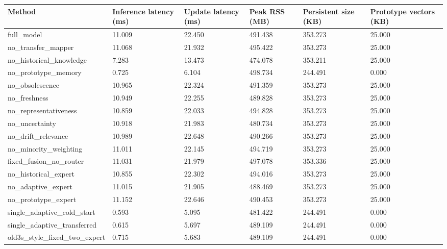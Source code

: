 \begin{tabular}{llllll}
\toprule
Method & Inference latency (ms) & Update latency (ms) & Peak RSS (MB) & Persistent size (KB) & Prototype vectors (KB) \\
\midrule
full\_model & 11.009 & 22.450 & 491.438 & 353.273 & 25.000 \\
no\_transfer\_mapper & 11.068 & 21.932 & 495.422 & 353.273 & 25.000 \\
no\_historical\_knowledge & 7.283 & 13.473 & 474.078 & 353.211 & 25.000 \\
no\_prototype\_memory & 0.725 & 6.104 & 498.734 & 244.491 & 0.000 \\
no\_obsolescence & 10.965 & 22.324 & 491.359 & 353.273 & 25.000 \\
no\_freshness & 10.949 & 22.255 & 489.828 & 353.273 & 25.000 \\
no\_representativeness & 10.859 & 22.033 & 494.828 & 353.273 & 25.000 \\
no\_uncertainty & 10.918 & 21.983 & 480.734 & 353.273 & 25.000 \\
no\_drift\_relevance & 10.989 & 22.648 & 490.266 & 353.273 & 25.000 \\
no\_minority\_weighting & 11.011 & 22.145 & 494.719 & 353.273 & 25.000 \\
fixed\_fusion\_no\_router & 11.031 & 21.979 & 497.078 & 353.336 & 25.000 \\
no\_historical\_expert & 10.855 & 22.302 & 494.016 & 353.273 & 25.000 \\
no\_adaptive\_expert & 11.015 & 21.905 & 488.469 & 353.273 & 25.000 \\
no\_prototype\_expert & 11.152 & 22.646 & 490.453 & 353.273 & 25.000 \\
single\_adaptive\_cold\_start & 0.593 & 5.095 & 481.422 & 244.491 & 0.000 \\
single\_adaptive\_transferred & 0.615 & 5.697 & 489.109 & 244.491 & 0.000 \\
old3s\_style\_fixed\_two\_expert & 0.715 & 5.683 & 489.109 & 244.491 & 0.000 \\
\bottomrule
\end{tabular}
